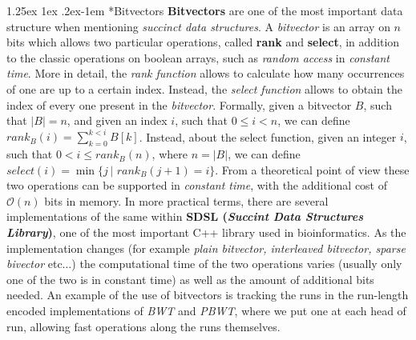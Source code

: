 \documentclass[a4paper,11pt, oneside]{article}
\makeatletter
\renewcommand{\paragraph}{%
  \@startsection{paragraph}{4}%
  {\z@}{1.25ex \@plus 1ex \@minus .2ex}{-1em}%
  {\normalfont\normalsize\bfseries}%
}
\makeatother
\begin{document}
\paragraph*{Bitvectors}
\textbf{Bitvectors} are one of the most important data structure when
mentioning \textit{succinct data structures}. 
A \textit{bitvector} is an array on $n$ bits which allows two particular
operations, called \textbf{rank} and \textbf{select}, in addition to the classic
operations on boolean arrays, such as \textit{random access} in
\textit{constant time}. More in detail, the \textit{rank
function} allows to calculate how many occurrences of one are up to a certain
index. Instead, the \textit{select function} allows to obtain the index of every
one present in the \textit{bitvector}. Formally, given a bitvector $B$, such
that $|B|=n$, and given an index $i$, such that $0\leq i<n$, we can define
$rank_B(i)=\sum_{k=0}^{k<i} B[k]$. Instead, about the select function, given an
integer $i$, such that $0<i\leq rank_B(n)$, where $n=|B|$, we can define
$select(i)=\min\{j \,| \,\, rank_B(j+1)=i\}$.
From a theoretical point of view these two operations can be supported in
\textit{constant time}, with the additional cost of $\mathcal{O}(n)$ bits in
memory. In more practical terms, there are several implementations of the 
same within \textbf{SDSL (\textit{Succint Data Structures Library})}, one of the
most important C++ library used in bioinformatics. As 
the implementation changes (for example \textit{plain bitvector, interleaved
  bitvector, sparse bivector} etc$\ldots$) the computational time of the two
operations varies (usually only one of the two is in constant time) as well as
the amount of additional bits needed. An example of the use of bitvectors is
tracking the runs in the run-length encoded implementations of \textit{BWT} and
\textit{PBWT}, where we put one at each head of run, allowing fast operations
along the runs themselves. 
\end{document}
